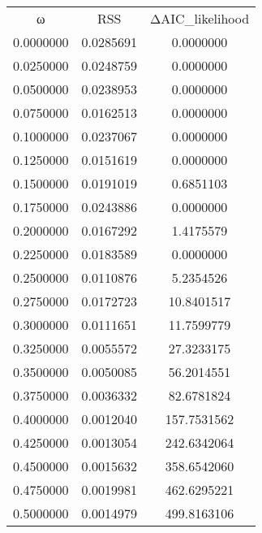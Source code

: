 \begin{tabular}{ccc}
ω & RSS & ΔAIC_likelihood\\
0.0000000 & 0.0285691 & 0.0000000\\
0.0250000 & 0.0248759 & 0.0000000\\
0.0500000 & 0.0238953 & 0.0000000\\
0.0750000 & 0.0162513 & 0.0000000\\
0.1000000 & 0.0237067 & 0.0000000\\
0.1250000 & 0.0151619 & 0.0000000\\
0.1500000 & 0.0191019 & 0.6851103\\
0.1750000 & 0.0243886 & 0.0000000\\
0.2000000 & 0.0167292 & 1.4175579\\
0.2250000 & 0.0183589 & 0.0000000\\
0.2500000 & 0.0110876 & 5.2354526\\
0.2750000 & 0.0172723 & 10.8401517\\
0.3000000 & 0.0111651 & 11.7599779\\
0.3250000 & 0.0055572 & 27.3233175\\
0.3500000 & 0.0050085 & 56.2014551\\
0.3750000 & 0.0036332 & 82.6781824\\
0.4000000 & 0.0012040 & 157.7531562\\
0.4250000 & 0.0013054 & 242.6342064\\
0.4500000 & 0.0015632 & 358.6542060\\
0.4750000 & 0.0019981 & 462.6295221\\
0.5000000 & 0.0014979 & 499.8163106\\
\end{tabular}
